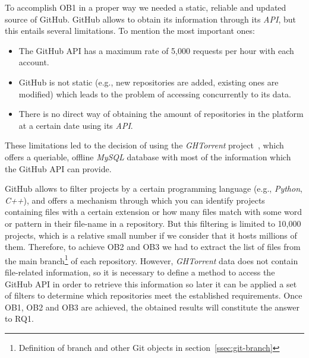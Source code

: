 \documentclass[a4paper, 12pt]{book}
\begin{document}
To accomplish OB1 in a proper way we needed a static, reliable and updated source of GitHub.
GitHub allows to obtain its information through its \textit{API},
but this entails several limitations. To mention the most important ones:

\begin{itemize}
    \item The GitHub API has a maximum rate of 5,000 requests per hour with each account.
    \item GitHub is not static (e.g., new repositories are added, existing ones are modified) which leads to the problem of
    accessing concurrently to its data.
    \item There is no direct way
    of obtaining the amount of repositories in the platform at a certain date using its \textit{API}.
\end{itemize}

These limitations led to the decision of using the \emph{GHTorrent} project~\cite{Gousi13}, which offers a queriable,
offline \emph{MySQL} database with most of the information which the GitHub API can provide.

GitHub allows to filter projects by a certain programming language (e.g., \emph{Python}, \emph{C++}),
and offers a mechanism through which you can identify projects containing files with a certain extension or how many files
match with some word or pattern in their file-name in a repository. But this filtering is limited to 10,000 projects, which is a relative small number if we consider that it hosts millions of them.
Therefore, to achieve OB2 and OB3 we had to extract the list of files
from the main branch\footnote{Definition of branch and other Git objects in section~\ref{ssec:git-branch}} of each repository.
However, \emph{GHTorrent} data does not contain file-related information, so it is necessary to define a method to access the GitHub API
in order to retrieve this information so later it can be applied a set of filters to determine which repositories meet the established
requirements. Once OB1, OB2 and OB3 are achieved, the obtained results will constitute the answer to RQ1.
\end{document}
